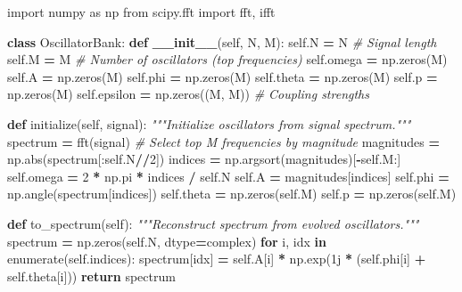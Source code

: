 \documentclass[
  11pt,
  a4paper,
]{article}
\newenvironment{Shaded}{\begin{snugshade}}{\end{snugshade}}
\newcommand{\BuiltInTok}[1]{#1}
\newcommand{\CommentTok}[1]{\textcolor[rgb]{0.56,0.35,0.01}{\textit{#1}}}
\newcommand{\ControlFlowTok}[1]{\textcolor[rgb]{0.13,0.29,0.53}{\textbf{#1}}}
\newcommand{\DecValTok}[1]{\textcolor[rgb]{0.00,0.00,0.81}{#1}}
\newcommand{\FunctionTok}[1]{\textcolor[rgb]{0.13,0.29,0.53}{\textbf{#1}}}
\newcommand{\ImportTok}[1]{#1}
\newcommand{\KeywordTok}[1]{\textcolor[rgb]{0.13,0.29,0.53}{\textbf{#1}}}
\newcommand{\NormalTok}[1]{#1}
\newcommand{\OperatorTok}[1]{\textcolor[rgb]{0.81,0.36,0.00}{\textbf{#1}}}
\newcommand{\OtherTok}[1]{\textcolor[rgb]{0.56,0.35,0.01}{#1}}
\newcommand{\VariableTok}[1]{\textcolor[rgb]{0.00,0.00,0.00}{#1}}
\begin{document}
\begin{Shaded}
\begin{Highlighting}[]
\ImportTok{import}\NormalTok{ numpy }\ImportTok{as}\NormalTok{ np}
\ImportTok{from}\NormalTok{ scipy.fft }\ImportTok{import}\NormalTok{ fft, ifft}

\KeywordTok{class}\NormalTok{ OscillatorBank:}
    \KeywordTok{def} \FunctionTok{\_\_init\_\_}\NormalTok{(}\VariableTok{self}\NormalTok{, N, M):}
        \VariableTok{self}\NormalTok{.N }\OperatorTok{=}\NormalTok{ N  }\CommentTok{\# Signal length}
        \VariableTok{self}\NormalTok{.M }\OperatorTok{=}\NormalTok{ M  }\CommentTok{\# Number of oscillators (top frequencies)}
        \VariableTok{self}\NormalTok{.omega }\OperatorTok{=}\NormalTok{ np.zeros(M)}
        \VariableTok{self}\NormalTok{.A }\OperatorTok{=}\NormalTok{ np.zeros(M)}
        \VariableTok{self}\NormalTok{.phi }\OperatorTok{=}\NormalTok{ np.zeros(M)}
        \VariableTok{self}\NormalTok{.theta }\OperatorTok{=}\NormalTok{ np.zeros(M)}
        \VariableTok{self}\NormalTok{.p }\OperatorTok{=}\NormalTok{ np.zeros(M)}
        \VariableTok{self}\NormalTok{.epsilon }\OperatorTok{=}\NormalTok{ np.zeros((M, M))  }\CommentTok{\# Coupling strengths}
    
    \KeywordTok{def}\NormalTok{ initialize(}\VariableTok{self}\NormalTok{, signal):}
        \CommentTok{"""Initialize oscillators from signal spectrum."""}
\NormalTok{        spectrum }\OperatorTok{=}\NormalTok{ fft(signal)}
        \CommentTok{\# Select top M frequencies by magnitude}
\NormalTok{        magnitudes }\OperatorTok{=}\NormalTok{ np.}\BuiltInTok{abs}\NormalTok{(spectrum[:}\VariableTok{self}\NormalTok{.N}\OperatorTok{//}\DecValTok{2}\NormalTok{])}
\NormalTok{        indices }\OperatorTok{=}\NormalTok{ np.argsort(magnitudes)[}\OperatorTok{{-}}\VariableTok{self}\NormalTok{.M:]}
        \VariableTok{self}\NormalTok{.omega }\OperatorTok{=} \DecValTok{2} \OperatorTok{*}\NormalTok{ np.pi }\OperatorTok{*}\NormalTok{ indices }\OperatorTok{/} \VariableTok{self}\NormalTok{.N}
        \VariableTok{self}\NormalTok{.A }\OperatorTok{=}\NormalTok{ magnitudes[indices]}
        \VariableTok{self}\NormalTok{.phi }\OperatorTok{=}\NormalTok{ np.angle(spectrum[indices])}
        \VariableTok{self}\NormalTok{.theta }\OperatorTok{=}\NormalTok{ np.zeros(}\VariableTok{self}\NormalTok{.M)}
        \VariableTok{self}\NormalTok{.p }\OperatorTok{=}\NormalTok{ np.zeros(}\VariableTok{self}\NormalTok{.M)}
    
    \KeywordTok{def}\NormalTok{ to\_spectrum(}\VariableTok{self}\NormalTok{):}
        \CommentTok{"""Reconstruct spectrum from evolved oscillators."""}
\NormalTok{        spectrum }\OperatorTok{=}\NormalTok{ np.zeros(}\VariableTok{self}\NormalTok{.N, dtype}\OperatorTok{=}\BuiltInTok{complex}\NormalTok{)}
        \ControlFlowTok{for}\NormalTok{ i, idx }\KeywordTok{in} \BuiltInTok{enumerate}\NormalTok{(}\VariableTok{self}\NormalTok{.indices):}
\NormalTok{            spectrum[idx] }\OperatorTok{=} \VariableTok{self}\NormalTok{.A[i] }\OperatorTok{*}\NormalTok{ np.exp(}\OtherTok{1j} \OperatorTok{*}\NormalTok{ (}\VariableTok{self}\NormalTok{.phi[i] }\OperatorTok{+} \VariableTok{self}\NormalTok{.theta[i]))}
        \ControlFlowTok{return}\NormalTok{ spectrum}


\end{Highlighting}
\end{Shaded}
\end{document}
